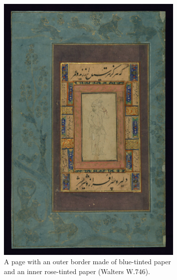 \begin{figure}[h!tp]
\begin{subfigure}[t]{.3\textwidth}
                \includegraphics[width=\textwidth]{images/W746_000001_sap.jpg}
		\caption{A page with an outer border made of blue-tinted paper and an inner rose-tinted paper (Walters W.746).}
                \label{fig:ara_blue}
        \end{subfigure}
	\hfill
	\begin{subfigure}[t]{.3\columnwidth}

\end{subfigure}
\end{figure}
